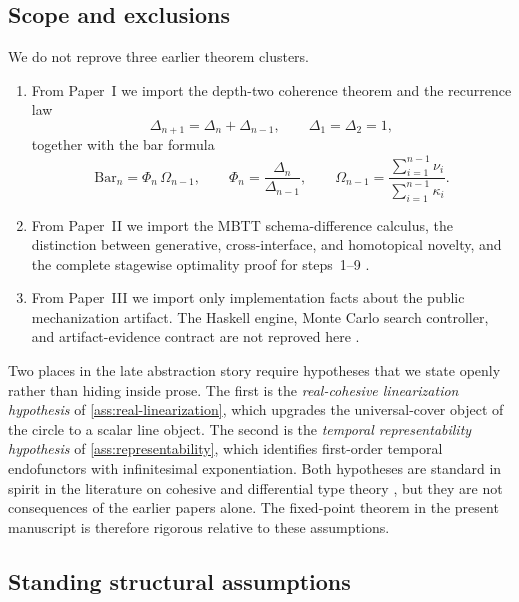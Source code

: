 \documentclass[11pt]{article}
\theoremstyle{plain}
\theoremstyle{definition}
\theoremstyle{remark}
\newcommand{\SelBar}{\mathrm{Bar}}
\begin{document}
\subsection{Scope and exclusions}

We do not reprove three earlier theorem clusters.

\begin{enumerate}
    \item From Paper~I we import the depth-two coherence theorem and the recurrence law
    \[
      \Delta_{n+1}=\Delta_n+\Delta_{n-1},
      \qquad
      \Delta_1=\Delta_2=1,
    \]
    together with the bar formula
    \[
      \SelBar_n = \Phi_n\,\Omega_{n-1},
      \qquad
      \Phi_n=\frac{\Delta_n}{\Delta_{n-1}},
      \qquad
      \Omega_{n-1}=\frac{\sum_{i=1}^{n-1}\nu_i}{\sum_{i=1}^{n-1}\kappa_i}.
    \]
    \item From Paper~II we import the MBTT schema-difference calculus, the distinction between generative, cross-interface, and homotopical novelty, and the complete stagewise optimality proof for steps~1--9 \citep{lande-generative}.
    \item From Paper~III we import only implementation facts about the public mechanization artifact. The Haskell engine, Monte Carlo search controller, and artifact-evidence contract are not reproved here \citep{lande-automation,lande-repo}.
\end{enumerate}

Two places in the late abstraction story require hypotheses that we state openly rather than hiding inside prose. The first is the \emph{real-cohesive linearization hypothesis} of \cref{ass:real-linearization}, which upgrades the universal-cover object of the circle to a scalar line object. The second is the \emph{temporal representability hypothesis} of \cref{ass:representability}, which identifies first-order temporal endofunctors with infinitesimal exponentiation. Both hypotheses are standard in spirit in the literature on cohesive and differential type theory \citep{lawvere,kock,schreiber,shulman-real-cohesive}, but they are not consequences of the earlier papers alone. The fixed-point theorem in the present manuscript is therefore rigorous relative to these assumptions.

\subsection{Standing structural assumptions}
\end{document}
